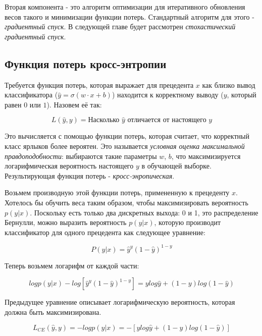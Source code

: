 \documentclass[a4paper,12pt,preview]{report} %
\begin{document}
	 Вторая компонента - это алгоритм оптимизации для итеративного обновления весов такого и минимизации функции потерь. Стандартный алгоритм для этого - \textit{градиентный спуск}. В следующей главе будет рассмотрен \textit{стохастический градиентный спуск}.
	
	\subsection{Функция потерь кросс-энтропии}
	
	Требуется функция потерь, которая выражает для прецедента $x$ как близко вывод классификатора ($\hat{y} = \sigma(w \cdot x + b)$) находится к корректному выводу ($y$, который равен $0$ или $1$). Назовем её так:
	
	\begin{equation}
	L(\hat{y}, y) = \textit{Насколько } \hat{y} \textit{ отличается от настоящего } y
	\end{equation}
	
	Это вычисляется с помощью функции потерь, которая считает, что корректный класс ярлыков более вероятен. Это называется \textit{условная оценка максимальной правдоподобности}: выбираются такие параметры $w$, $b$, что максимизируется логарифмическая вероятность настоящего $y$ в обучающей выборке. Результирующая функция потерь - \textit{кросс-энропическая}.
	
	Возьмем производную этой функции потерь, примененную к прецеденту $x$. Хотелось бы обучить веса таким образом, чтобы максимизировать вероятность $p(y | x)$. Поскольку есть только два дискретных выхода: 0 и 1, это распределение Бернулли, можно выразить вероятность $p(y | x)$, которую производит классификатор для одного прецедента как следующее уравнение:
	
	\begin{equation}
	P(y | x) = \hat{y}^y (1 - \hat{y})^{1 - y}
	\end{equation}
	
	Теперь возьмем логарифм от каждой части:
	
	\begin{equation}
	log p(y | x) - log[ \hat{y}^y (1 - \hat{y})^{1 - y}] = y log \hat{y} + (1 - y) log(1 - \hat{y})
	\end{equation}
	
	Предыдущее уравнение описывает логарифмическую вероятность, которая должна быть максимизирована.
	
	\begin{equation}
	L_{CE} (\hat{y}, y) = -log p(y | x) = -[y log \hat{y} + (1 - y) log(1 - \hat{y})]
	\end{equation}
	
\end{document}
